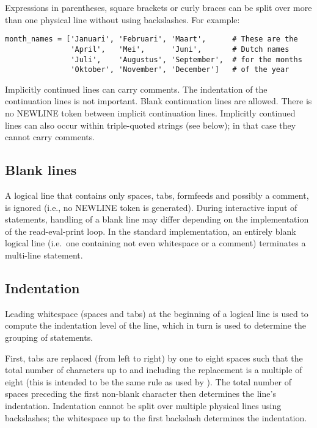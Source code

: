 Expressions in parentheses, square brackets or curly braces can be
split over more than one physical line without using backslashes.
For example:

\begin{verbatim}
month_names = ['Januari', 'Februari', 'Maart',      # These are the
               'April',   'Mei',      'Juni',       # Dutch names
               'Juli',    'Augustus', 'September',  # for the months
               'Oktober', 'November', 'December']   # of the year
\end{verbatim}

Implicitly continued lines can carry comments.  The indentation of the
continuation lines is not important.  Blank continuation lines are
allowed.  There is no NEWLINE token between implicit continuation
lines.  Implicitly continued lines can also occur within triple-quoted
strings (see below); in that case they cannot carry comments.


\subsection{Blank lines \label{blank-lines}}

A logical line that contains only spaces, tabs, formfeeds and possibly
a comment, is ignored (i.e., no NEWLINE token is generated).  During
interactive input of statements, handling of a blank line may differ
depending on the implementation of the read-eval-print loop.  In the
standard implementation, an entirely blank logical line (i.e.\ one
containing not even whitespace or a comment) terminates a multi-line
statement.


\subsection{Indentation\label{indentation}}

Leading whitespace (spaces and tabs) at the beginning of a logical
line is used to compute the indentation level of the line, which in
turn is used to determine the grouping of statements.

First, tabs are replaced (from left to right) by one to eight spaces
such that the total number of characters up to and including the
replacement is a multiple of
eight (this is intended to be the same rule as used by \UNIX).  The
total number of spaces preceding the first non-blank character then
determines the line's indentation.  Indentation cannot be split over
multiple physical lines using backslashes; the whitespace up to the
first backslash determines the indentation.


